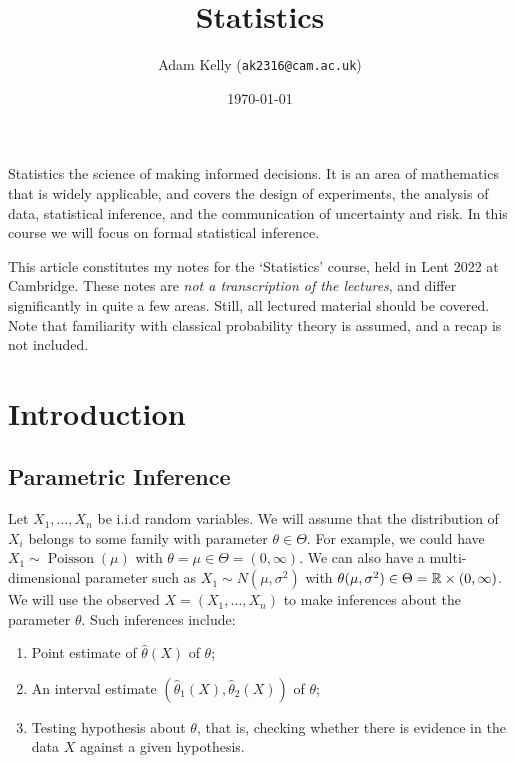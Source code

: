 \documentclass[a4paper]{scrartcl}
\title{Statistics}
\author{Adam Kelly (\texttt{ak2316@cam.ac.uk})}
\date{\today}
\begin{document}
\maketitle


Statistics the science of making informed decisions. It is an area of mathematics that is widely applicable, and covers the design of experiments, the analysis of data, statistical inference, and the communication of uncertainty and risk.
In this course we will focus on formal statistical inference.


This article constitutes my notes for the `Statistics' course, held in Lent 2022 at Cambridge. These notes are \emph{not a transcription of the lectures}, and differ significantly in quite a few areas. Still, all lectured material should be covered.
Note that familiarity with classical probability theory is assumed, and a recap is not included.


\tableofcontents

\section{Introduction}

\subsection{Parametric Inference}

Let $X_1, \dots, X_n$ be i.i.d random variables. We will assume that the distribution of $X_i$ belongs to some family with parameter $\theta \in \Theta$.
For example, we could have $X_1 \sim \operatorname{Poisson}(\mu)$ with $\theta = \mu \in \Theta = (0, \infty)$. We can also have a multi-dimensional parameter such as $X_1 \sim N(\mu, \sigma^2)$ with $\theta(\mu, \sigma^2) \in \Theta = \mathbb{R} \times (0, \infty)$.
We will use the observed $X = (X_1, \dots, X_n)$ to make inferences about the parameter $\theta$. Such inferences include:

\begin{enumerate}
  \item Point estimate of $\hat{\theta}(X)$ of $\theta$;
  \item An interval estimate $(\hat{\theta}_1(X), \hat{\theta}_2(X))$ of $\theta$;
  \item Testing hypothesis about $\theta$, that is, checking whether there is evidence in the data $X$ against a given hypothesis.
\end{enumerate}
\end{document}
